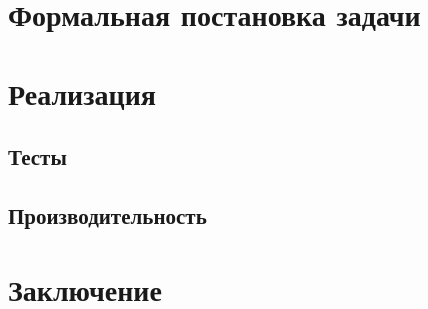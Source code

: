 \documentclass{article}
\begin{document}
\section{Формальная постановка задачи}

\section{Реализация}
\subsection{Тесты}
\subsection{Производительность}
\section{Заключение}




\end{document}
